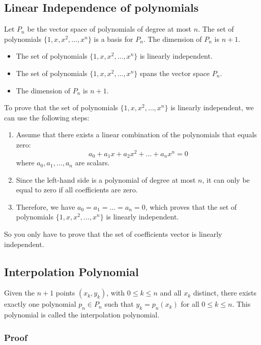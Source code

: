 \subsection{Linear Independence of polynomials}
Let $P_n$ be the vector space of polynomials of degree at most $n$. The set of polynomials $\{1, x, x^2, \ldots, x^n\}$ is a basis for $P_n$.
The dimension of $P_n$ is $n + 1$.
\begin{itemize}[label=$-$]
    \item The set of polynomials $\{1, x, x^2, \ldots, x^n\}$ is linearly independent.
    \item The set of polynomials $\{1, x, x^2, \ldots, x^n\}$ spans the vector space $P_n$.
    \item The dimension of $P_n$ is $n + 1$.
\end{itemize}

To prove that the set of polynomials $\{1, x, x^2, \ldots, x^n\}$ is linearly independent, we can use the following steps:
\begin{enumerate}
    \item Assume that there exists a linear combination of the polynomials that equals zero:
    \[
        a_0 + a_1 x + a_2 x^2 + \ldots + a_n x^n = 0
    \]
    where $a_0, a_1, \ldots, a_n$ are scalars.
    \item Since the left-hand side is a polynomial of degree at most $n$, it can only be equal to zero if all coefficients are zero.
    \item Therefore, we have $a_0 = a_1 = \ldots = a_n = 0$, which proves that the set of polynomials $\{1, x, x^2, \ldots, x^n\}$ is linearly independent.
\end{enumerate}

So you only have to prove that the set of coefficients vector is linearly independent.

\subsection{Interpolation Polynomial}

Given the $n+1$ points $(x_k, y_k)$, with $0 \leq k \leq n$ and all $x_k$ distinct, there exists exactly one polynomial $p_n \in P_n$ such that $y_k = p_n(x_k)$ for all $0 \leq k \leq n$. This polynomial is called the interpolation polynomial.

\subsubsection*{Proof}


